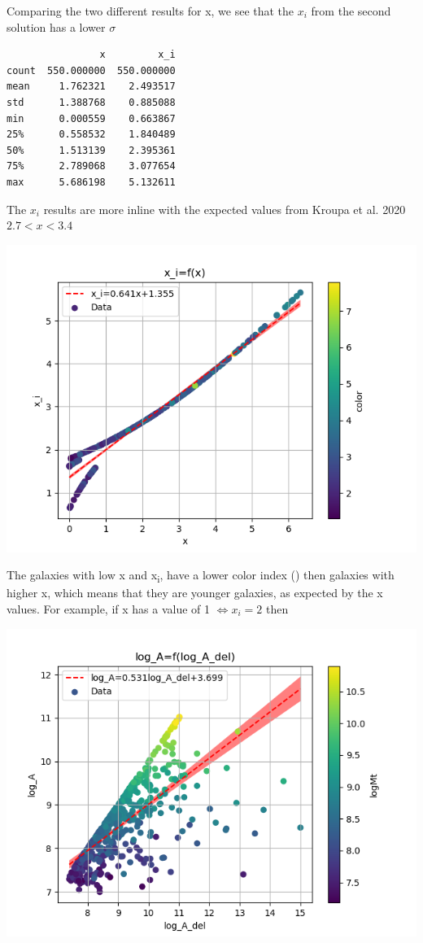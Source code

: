 \documentclass[a4paper]{article}
\begin{document}
Comparing the two different results for x, we see that the \(x_i\) from the second solution has a lower \(\sigma\)
\begin{verbatim}
                x         x_i
count  550.000000  550.000000
mean     1.762321    2.493517
std      1.388768    0.885088
min      0.000559    0.663867
25%      0.558532    1.840489
50%      1.513139    2.395361
75%      2.789068    3.077654
max      5.686198    5.132611
\end{verbatim}


The \(x_i\) results are more inline with the expected values from Kroupa et al. 2020 \(2.7<x<3.4\)
\begin{center}
\includegraphics[width=.9\linewidth]{./graphs/x-x_icolor_color.png}
\end{center}

The galaxies with low x and x\textsubscript{i}, have a lower color index (\(<B-V>\)) then galaxies with higher x, which means that they are younger galaxies, as expected by the x values. For example, if x has a value of 1 \(\Leftrightarrow x_i=2\) then

\begin{center}
\includegraphics[width=.9\linewidth]{./graphs/log_A_del-log_A.png}
\end{center}
\end{document}

